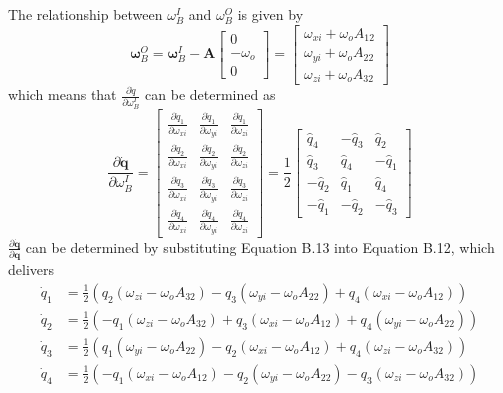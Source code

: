 The relationship between $\omega_{B}^{I}$ and $\omega_{B}^{O}$ is given by
$$
\boldsymbol{\omega}_{B}^{O}=\boldsymbol{\omega}_{B}^{I}-\mathbf{A}\left[\begin{array}{c}
0 \\
-\omega_{o} \\
0
\end{array}\right]=\left[\begin{array}{c}
\omega_{x i}+\omega_{o} A_{12} \\
\omega_{y i}+\omega_{o} A_{22} \\
\omega_{z i}+\omega_{o} A_{32}
\end{array}\right]
$$
which means that $\frac{\partial \dot{q}}{\partial \omega_{B}^{I}}$ can be determined as
$$
\frac{\partial \dot{\mathbf{q}}}{\partial \omega_{B}^{I}}=\left[\begin{array}{ccc}
\frac{\partial \dot{q}_{1}}{\partial \omega_{x i}} & \frac{\partial \dot{q}_{1}}{\partial \omega_{y i}} & \frac{\partial \dot{q}_{1}}{\partial \omega_{z i}} \\
\frac{\partial \dot{q}_{2}}{\partial \omega_{x i}} & \frac{\partial \dot{q}_{2}}{\partial \omega_{y i}} & \frac{\partial \dot{q}_{2}}{\partial \omega_{z i}} \\
\frac{\partial \dot{q}_{3}}{\partial \omega_{x i}} & \frac{\partial \dot{q}_{3}}{\partial \omega_{y i}} & \frac{\partial \dot{q}_{3}}{\partial \omega_{z i}} \\
\frac{\partial \dot{q}_{4}}{\partial \omega_{x i}} & \frac{\partial \dot{q}_{4}}{\partial \omega_{y i}} & \frac{\partial \dot{q}_{4}}{\partial \omega_{z i}}
\end{array}\right]=\frac{1}{2}\left[\begin{array}{ccc}
\hat{q}_{4} & -\hat{q}_{3} & \hat{q}_{2} \\
\hat{q}_{3} & \hat{q}_{4} & -\hat{q}_{1} \\
-\hat{q}_{2} & \hat{q}_{1} & \hat{q}_{4} \\
-\hat{q}_{1} & -\hat{q}_{2} & -\hat{q}_{3}
\end{array}\right]
$$
$\frac{\partial \dot{\mathbf{q}}}{\partial \mathbf{q}}$ can be determined by substituting Equation B.13 into Equation B.12, which delivers
$$
\begin{aligned}
\dot{q}_{1} &=\frac{1}{2}\left(q_{2}\left(\omega_{z i}-\omega_{o} A_{32}\right)-q_{3}\left(\omega_{y i}-\omega_{o} A_{22}\right)+q_{4}\left(\omega_{x i}-\omega_{o} A_{12}\right)\right) \\
\dot{q}_{2} &=\frac{1}{2}\left(-q_{1}\left(\omega_{z i}-\omega_{o} A_{32}\right)+q_{3}\left(\omega_{x i}-\omega_{o} A_{12}\right)+q_{4}\left(\omega_{y i}-\omega_{o} A_{22}\right)\right) \\
\dot{q}_{3} &=\frac{1}{2}\left(q_{1}\left(\omega_{y i}-\omega_{o} A_{22}\right)-q_{2}\left(\omega_{x i}-\omega_{o} A_{12}\right)+q_{4}\left(\omega_{z i}-\omega_{o} A_{32}\right)\right) \\
\dot{q}_{4} &=\frac{1}{2}\left(-q_{1}\left(\omega_{x i}-\omega_{o} A_{12}\right)-q_{2}\left(\omega_{y i}-\omega_{o} A_{22}\right)-q_{3}\left(\omega_{z i}-\omega_{o} A_{32}\right)\right)
\end{aligned}
$$
